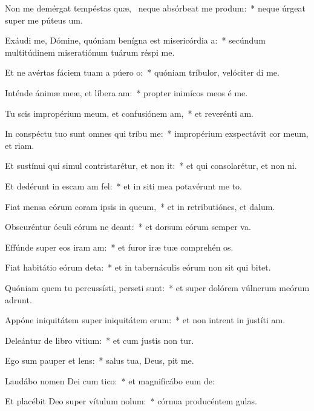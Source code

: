 \item Non me demérgat tempéstas quæ,~\pscross{} neque absórbeat me produm:~* neque úrgeat super me púteus  um.
\item Exáudi me, Dómine, quóniam benígna est misericórdia a:~* secúndum multitúdinem miseratiónum tuárum réspi  me.
\item Et ne avértas fáciem tuam a púero o:~* quóniam tríbulor, velóciter di me.
\item Inténde ánimæ meæ, et líbera am:~* propter inimícos meos é me.
\item Tu scis impropérium meum, et confusiónem am,~* et reverénti am.
\item In conspéctu tuo sunt omnes qui tríbu me:~* impropérium exspectávit cor meum, et riam.
\item Et sustínui qui simul contristarétur, et non it:~* et qui consolarétur, et non ni.
\item Et dedérunt in escam am fel:~* et in siti mea potavérunt me to.
\item Fiat mensa eórum coram ipsis in queum,~* et in retributiónes, et  dalum.
\item Obscuréntur óculi eórum ne deant:~* et dorsum eórum semper va.
\item Effúnde super eos iram am:~* et furor iræ tuæ comprehén os.
\item Fiat habitátio eórum deta:~* et in tabernáculis eórum non sit qui bitet.
\item Quóniam quem tu percussísti, perseti sunt:~* et super dolórem vúlnerum meórum adrunt.
\item Appóne iniquitátem super iniquitátem erum:~* et non intrent in justíti am.
\item Deleántur de libro vitium:~* et cum justis non tur.
\item Ego sum pauper et lens:~* salus tua, Deus, pit me.
\item Laudábo nomen Dei cum tico:~* et magnificábo eum  de:
\item Et placébit Deo super vítulum nolum:~* córnua producéntem  gulas.
